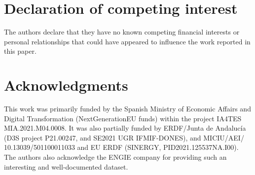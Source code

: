 \documentclass[preprint,12pt]{elsarticle}
\begin{document}
\section*{Declaration of competing interest}
The authors declare that they have no known competing financial
interests or personal relationships that could have appeared to influence
the work reported in this paper.

\section*{Acknowledgments}
This work was primarily funded by the Spanish Ministry of Economic Affairs and Digital Transformation (NextGenerationEU funds) within the project IA4TES MIA.2021.M04.0008. It was also partially funded by ERDF/Junta de Andalucía (D3S project P21.00247, and SE2021 UGR IFMIF-DONES), and MICIU/AEI/ \\10.13039/501100011033 and EU ERDF (SINERGY, PID2021.125537NA.I00).
%
The authors also acknowledge the ENGIE company for providing such an interesting and well-documented dataset.




\nocite{*}
%
 

\end{document}

